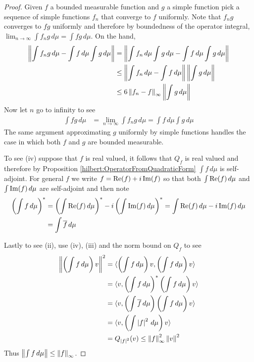 \begin{proof}
Given $f$ a bounded measurable function and $g$ a simple function
pick a sequence of simple functions $f_n$ that converge to $f$
uniformly.  Note that $f_n g$ converges to $f g$ uniformly and therefore by boundedness of
the operator integral, $\lim_{n \to \infty} \int f_n g \, d\mu = \int f g \, d\mu$. On the hand,
\begin{align*}
  \left \lVert \int f_n g \, d\mu - \int f \, d\mu \int g \, d\mu \right \rVert
  &= \left \lVert \int f_n  \, d\mu \int g \, d\mu - \int f \, d\mu \int g
    \, d\mu \right \rVert \\
  &\leq \left \lVert \int f_n  \, d\mu - \int f \, d\mu \right \rVert \left \lVert \int g \, d\mu \right \rVert \\
  &\leq 6 \left \lVert f_n - f  \right \rVert_\infty \left \lVert \int g \, d\mu \right \rVert \\
\end{align*}
Now let $n$ go to infinity to see
\begin{align*}
  \int f g \, d\mu &= \lim_{n \to \infty} \int f_n g \,d\mu  = \int f
                     \, d\mu \int g \, d\mu
\end{align*}
The same argument approximating $g$ uniformly by simple functions handles the case in which both $f$ and
$g$ are bounded measurable.

To see (iv) suppose that $f$ is real valued, it follows that $Q_f$ is
real valued and therefore by Proposition
\ref{hilbert:OperatorFromQuadraticForm} $\int f \, d\mu$ is self-adjoint.   For
general $f$ we write $f = \operatorname*{Re}(f) + i\operatorname*{Im}(f)$ so that both $\int
\operatorname*{Re}(f) \, d\mu$ and $\int \operatorname*{Im}(f) \, d\mu$ are self-adjoint and
then note
\begin{align*}
  \left( \int f \, d\mu \right)^*
  &= \left( \int \operatorname*{Re}(f) \, d\mu \right)^* - i \left( \int
    \operatorname*{Im}(f) \, d\mu \right)^*
    = \int \operatorname*{Re}(f) \, d\mu  -i \operatorname*{Im}(f) \, d\mu \\
  &= \int    \overline{f} \, d\mu
\end{align*}

Lastly to see (ii), use (iv), (iii) and the norm bound on $Q_f$ to see
\begin{align*}
  \left \lVert \left(\int f \, d\mu\right) v \right \rVert^2
  &= \langle \left(\int f \, d\mu\right) v, \left(\int f \,
    d\mu\right) v \rangle \\
  &= \langle v, \left(\int f \, d\mu\right)^* \left(\int f \,
    d\mu\right) v \rangle \\
  &= \langle v, \left(\int \overline{f} \, d\mu\right)\left(\int f \,
    d\mu\right) v \rangle \\
  &= \langle v, \left(\int \left \vert f \right \vert^2 \, d\mu\right) v \rangle \\
  &= Q_{\left \vert f \right \vert^2}(v) \leq \left \lVert f \right \rVert_\infty^2 \left \lVert v \right \rVert^2\\
\end{align*}
Thus $\left \lVert \int f \, d\mu \right \rVert \leq \left \lVert f \right \rVert_\infty$.
\end{proof}

